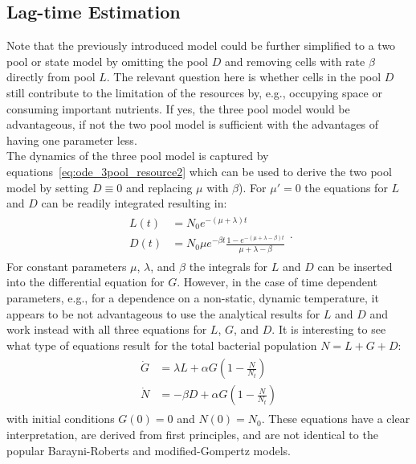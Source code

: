 \documentclass[10pt,A4paper]{article}
\numberwithin{equation}{section}
\begin{document}
\subsection{Lag-time Estimation}
Note that the previously introduced model could be further simplified to a two pool or state model by omitting the pool $D$ and removing cells with rate $\beta$ directly from pool $L$.
The relevant question here is whether cells in the pool $D$ still contribute to the limitation of the resources by, e.g., occupying space or consuming important nutrients.
If yes, the three pool model would be advantageous, if not the two pool model is sufficient with the advantages of having one parameter less.\\
%
The dynamics of the three pool model is captured by equations~\ref{eq:ode_3pool_resource2} which can be used to derive the two pool model by setting $D\equiv 0$ and replacing $\mu$ with $\beta$).
For $\mu'=0$ the equations for $L$ and $D$ can be readily integrated resulting in:
\begin{align}
    \begin{split}
        L(t) &= N_0 e^{-(\mu+\lambda)t}\\
        D(t) &= N_0 \mu e^{-\beta t}\frac{1-e^{-(\mu+\lambda-\beta)t}}{\mu+\lambda-\beta}
    \end{split}.
\end{align}
For constant parameters $\mu$, $\lambda$, and $\beta$ the integrals for $L$ and $D$ can be inserted into the differential equation for $G$.
However, in the case of time dependent parameters, e.g., for a dependence on a non-static, dynamic temperature, it appears to be not advantageous to use the analytical results for $L$ and $D$ and work instead with all three equations for $L$, $G$, and $D$.
It is interesting to see what type of equations result for the total bacterial population $N=L+G+D$:
\begin{align}
    \begin{split}
        \dot{G} &= \lambda L + \alpha G\left(1-\frac{N}{N_t}\right)\\
        \dot{N} &= - \beta D + \alpha G\left(1-\frac{N}{N_t}\right)
    \end{split}
\end{align}
with initial conditions $G(0)=0$ and $N(0)=N_0$.
These equations have a clear interpretation, are derived from first principles, and are not identical to the popular Barayni-Roberts and modified-Gompertz models.
\end{document}
